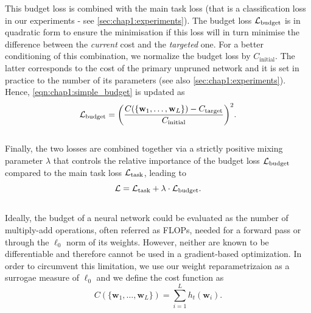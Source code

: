 \noindent This budget loss is combined with the main task loss (that is a
classification loss in our experiments - see \cref{sec:chap1:experiments}). The
budget loss $ {\cal L}_\text{budget}$ is in quadratic form to ensure the
minimisation if this loss will in turn minimise the difference between the {\em
current} cost and the {\em targeted} one. For a better  conditioning of this
combination, we normalize the budget loss by $C_\text{initial}$. The latter
corresponds to the cost of the primary unpruned network and it is set in
practice to the number of its parameters (see also
\cref{sec:chap1:experiments}). Hence, \cref{eqn:chap1:simple_budget} is updated
as  \\

\begin{equation}
  \label{eqn:realbudget}
  {\cal L}_\text{budget} = \biggl( \displaystyle\frac{C(\{\mathbf{w}_1,\dots, \mathbf{w}_L\}) - C_\text{target}}{C_\text{initial}} \biggr)^2.
\end{equation}\\

Finally, the two losses are combined together via a strictly positive mixing
parameter $\lambda$ that  controls the relative importance of  the budget loss
${\cal L}_\text{budget}$ compared to the main task loss ${\cal L}_\text{task}$,
leading to\\

\begin{equation}
  \label{eqn:globalloss}
   {\cal L} =  {\cal L}_\text{task} + \lambda \cdot {\cal L}_\text{budget}.
\end{equation} \\

Ideally, the budget of a neural network could be evaluated as the number of
multiply-add operations, often referred as \ac{FLOPs}, needed for a forward pass
or through the $\ell_0$ norm of its weights. However, neither are known to be
differentiable and therefore cannot be used in a gradient-based optimization. In
order to circumvent this limitation, we use our weight reparametrizaion as a
surrogae measure of $\ell_0$ and we define the cost function as \\

\begin{equation}
  \label{eqn:chap1:cost_function}
  C(\{\mathbf{w}_1,\dots, \mathbf{w}_L\}) = \displaystyle \sum_{i=1}^{L} h_t(\mathbf{w}_i). 
\end{equation} \\

